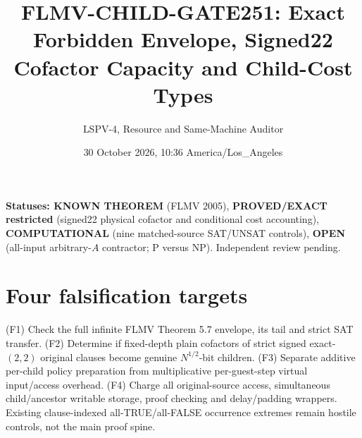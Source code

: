 \documentclass[10pt]{article}
\title{FLMV-CHILD-GATE251: Exact Forbidden Envelope, Signed22 Cofactor Capacity and Child-Cost Types}
\author{LSPV-4, Resource and Same-Machine Auditor}
\date{30 October 2026, 10:36 America/Los\_Angeles}
\begin{document}
\maketitle
\noindent\textbf{Statuses: KNOWN THEOREM} (FLMV 2005), \textbf{PROVED/EXACT restricted} (signed22 physical cofactor and conditional cost accounting), \textbf{COMPUTATIONAL} (nine matched-source SAT/UNSAT controls), \textbf{OPEN} (all-input arbitrary-$A$ contractor; P versus NP). Independent review pending.

\section{Four falsification targets}
(F1) Check the full infinite FLMV Theorem 5.7 envelope, its tail and strict SAT transfer. (F2) Determine if fixed-depth plain cofactors of strict signed exact-$(2,2)$ original clauses become genuine $N^{1/2}$-bit children. (F3) Separate additive per-child policy preparation from multiplicative per-guest-step virtual input/access overhead. (F4) Charge all original-source access, simultaneous child/ancestor writable storage, proof checking and delay/padding wrappers. Existing clause-indexed all-TRUE/all-FALSE occurrence extremes remain hostile controls, not the main proof spine.
\end{document}
